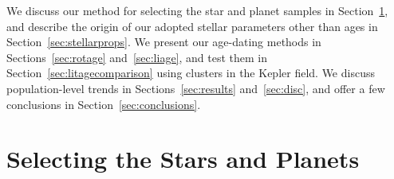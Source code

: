 \documentclass[11pt,twocolumn,tighten]{aastex63}
\begin{document}
We discuss our method for selecting the star and planet samples in
Section~\ref{sec:selection}, and describe the origin of our adopted
stellar parameters other than ages in Section~\ref{sec:stellarprops}.
We present our age-dating methods in Sections~\ref{sec:rotage}
and~\ref{sec:liage}, and test them in
Section~\ref{sec:litagecomparison} using clusters in the Kepler field.
We discuss population-level trends in Sections~\ref{sec:results}
and~\ref{sec:disc}, and offer a few conclusions in
Section~\ref{sec:conclusions}.


\section{Selecting the Stars and Planets}
\label{sec:selection}


\begin{figure}[!t]
	\begin{center}
	

\end{center}
\end{figure}
\end{document}
